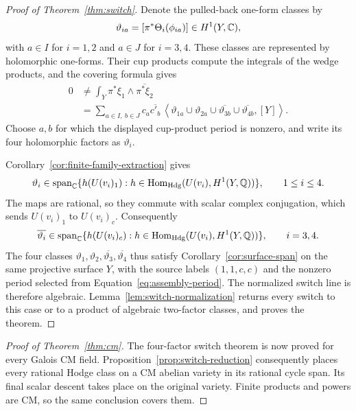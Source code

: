 \begin{proof}[Proof of Theorem~\ref{thm:switch}]
Denote the pulled-back one-form classes by
\[
 \vartheta_{ia}=[\pi^*\Theta_i(\phi_{ia})]\in H^1(Y,\mathbb{C}),
\]
with \(a\in I\) for \(i=1,2\) and \(a\in J\) for \(i=3,4\).
These classes are represented by holomorphic one-forms.  Their cup
products compute the integrals of the wedge products, and the
covering formula gives
\begin{equation}\label{eq:assembly-period}
\begin{split}
 0&\ne\int_Y\pi^*\xi_1\wedge\overline{\pi^*\xi_2}\\
  &=\sum_{a\in I,\ b\in J}c_a\overline{c'_b}\,
    \left\langle
      \vartheta_{1a}\cup\vartheta_{2a}\cup
      \overline{\vartheta_{3b}}\cup\overline{\vartheta_{4b}},[Y]
    \right\rangle .
\end{split}
\end{equation}
Choose \(a,b\) for which the displayed cup-product period is nonzero,
and write its four holomorphic factors as \(\vartheta_i\).

Corollary~\ref{cor:finite-family-extraction} gives
\[
 \vartheta_i\in\operatorname{span}_{\mathbb{C}}
 \{h(U(v_i)_1):
       h\in\operatorname{Hom}_{\mathrm{Hdg}}(U(v_i),H^1(Y,\mathbb{Q}))\},
 \qquad 1\leq i\leq4.
\]
The maps are rational, so they commute with scalar complex
conjugation, which sends \(U(v_i)_1\) to \(U(v_i)_c\).  Consequently
\[
 \overline{\vartheta_i}\in\operatorname{span}_{\mathbb{C}}
 \{h(U(v_i)_c):
       h\in\operatorname{Hom}_{\mathrm{Hdg}}(U(v_i),H^1(Y,\mathbb{Q}))\},
 \qquad i=3,4.
\]
The four classes
\(\vartheta_1,\vartheta_2,\overline{\vartheta_3},
\overline{\vartheta_4}\) thus satisfy
Corollary~\ref{cor:surface-span} on the same projective surface \(Y\),
with the source labels \((1,1,c,c)\) and the nonzero period selected
from Equation~\eqref{eq:assembly-period}.  The normalized switch line
is therefore algebraic.  Lemma~\ref{lem:switch-normalization} returns
every switch to this case or
to a product of algebraic two-factor classes, and proves the theorem.
\end{proof}

\begin{proof}[Proof of Theorem~\ref{thm:cm}]
The four-factor switch theorem is now proved for every Galois CM field.
Proposition~\ref{prop:switch-reduction} consequently places every
rational Hodge class on a CM abelian variety in its rational cycle
span.  Its final scalar descent takes place on the original variety.
Finite products and powers are CM, so the same conclusion covers them.
\end{proof}
